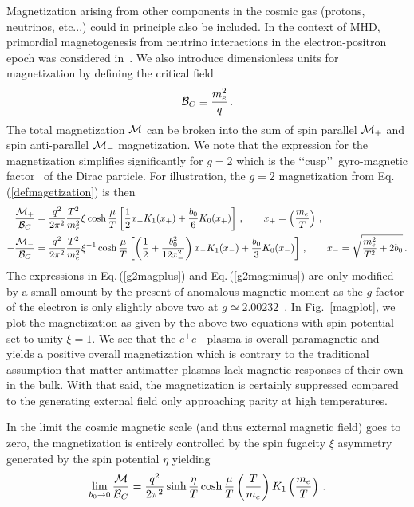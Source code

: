 \documentclass[a4paper]{article}
\newcommand{\req}[1]{Eq.\,(\ref{#1})}
\newcommand{\rf}[1]{Fig.~{\ref{#1}}}
\begin{document}
Magnetization arising from other components in the cosmic gas (protons, neutrinos, etc...) could in principle also be included. In the context of MHD, primordial magnetogenesis from neutrino interactions in the electron-positron epoch was considered in~\cite{perrone2021neutrinoelectron}. We also introduce dimensionless units for magnetization by defining the critical field
\begin{align}
    {\cal B}_{C}\equiv\frac{m_{e}^{2}}{q}\,.
\end{align}
The total magnetization ${\cal M}$ can be broken into the sum of spin parallel ${\cal M}_{+}$ and spin anti-parallel ${\cal M}_{-}$ magnetization. We note that the expression for the magnetization simplifies significantly for $g=2$ which is the \lq\lq cusp\rq\rq\ gyro-magnetic factor~\cite{rafelski2022study} of the Dirac particle. For illustration, the $g=2$ magnetization from \req{defmagetization} is then
\begin{align}
    \label{g2magplus}
    \frac{{\cal M}_{+}}{{\cal B}_{C}}&=\frac{q^{2}}{2\pi^{2}}\frac{T^{2}}{m_{e}^{2}}\xi\cosh{\frac{\mu}{T}}\left[\frac{1}{2}x_{+}K_{1}(x_{+})+\frac{b_{0}}{6}K_{0}(x_{+})\right]\,,\qquad x_{+}=\left(\frac{m_{e}}{T}\right)\,,\\
    \label{g2magminus}
    -\frac{{\cal M}_{-}}{{\cal B}_{C}}&=\frac{q^{2}}{2\pi^{2}}\frac{T^{2}}{m_{e}^{2}}\xi^{-1}\cosh{\frac{\mu}{T}}\left[\left(\frac{1}{2}+\frac{b_{0}^{2}}{12x_{-}^{2}}\right)x_{-}K_{1}(x_{-})+\frac{b_{0}}{3}K_{0}(x_{-})\right]\,,\qquad x_{-}=\sqrt{\frac{m_{e}^{2}}{T^{2}}+2b_{0}}\,.
\end{align}
The expressions in \req{g2magplus} and \req{g2magminus} are only modified by a small amount by the present of anomalous magnetic moment as the $g$-factor of the electron is only slightly above two at $g\simeq2.00232$~\cite{tiesinga2021codata}. In \rf{magplot}, we plot the magnetization as given by the above two equations with spin potential set to unity $\xi=1$. We see that the $e^{+}e^{-}$ plasma is overall paramagnetic and yields a positive overall magnetization which is contrary to the traditional assumption that matter-antimatter plasmas lack magnetic responses of their own in the bulk. With that said, the magnetization is certainly suppressed compared to the generating external field only approaching parity at high temperatures.

In the limit the cosmic magnetic scale (and thus external magnetic field) goes to zero, the magnetization is entirely controlled by the spin fugacity $\xi$ asymmetry generated by the spin potential $\eta$ yielding
\begin{align}
    \lim_{b_{0}\rightarrow0}\frac{\cal M}{{\cal B}_{C}}=\frac{q^{2}}{2\pi^{2}}\sinh{\frac{\eta}{T}}\cosh{\frac{\mu}{T}}\left(\frac{T}{m_{e}}\right)K_{1}\left(\frac{m_{e}}{T}\right)\,.
\end{align}
\end{document}
